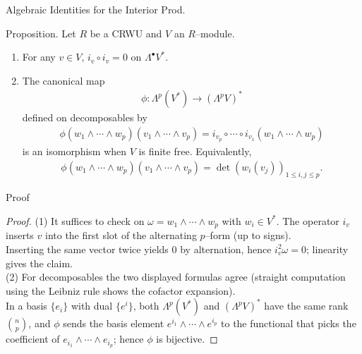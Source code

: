 

\begin{frame}{Algebraic Identities for the Interior Prod.}
\vspace{-0.3cm}
\begin{block}{Proposition.}
Let $R$ be a CRWU and $V$ an $R$–module.
\begin{enumerate}
\item For any $v\in V$, $i_v\circ i_v=0$ on $\Lambda^{\bullet}V^*$.
\item The canonical map
\begin{align*}
\phi:\Lambda^{p}(V^{*})\longrightarrow (\Lambda^{p}V)^{*}
\end{align*}
defined on decomposables by
\begin{align*}
\phi(w_1\wedge\cdots\wedge w_p)(v_1\wedge\cdots\wedge v_p)
= i_{v_p}\circ\cdots\circ i_{v_1}(w_1\wedge\cdots\wedge w_p)
\end{align*}
is an isomorphism when $V$ is finite free. Equivalently,
\begin{align*}
\phi(w_1\wedge\cdots\wedge w_p)(v_1\wedge\cdots\wedge v_p)
=\det\!\left(w_i(v_j)\right)_{1\le i,j\le p}.
\end{align*}
\end{enumerate}
\end{block}
\end{frame}

\begin{frame}{Proof}
    \begin{proof}
(1) It suffices to check on $\omega=w_1\wedge\cdots\wedge w_p$ with $w_i\in V^*$. The operator $i_v$ inserts $v$ into the first slot of the alternating $p$–form (up to signs).\\
Inserting the same vector twice yields $0$ by alternation, hence $i_v^2\omega=0$; linearity gives the claim.\\

(2) For decomposables the two displayed formulas agree (straight computation using the Leibniz rule shows the cofactor expansion).\\
In a basis $\{e_i\}$ with dual $\{e^i\}$, both $\Lambda^{p}(V^*)$ and $(\Lambda^{p}V)^*$ have the same rank $\binom{n}{p}$, and $\phi$ sends the basis element $e^{i_1}\wedge\cdots\wedge e^{i_p}$ to the functional that picks the coefficient of $e_{i_1}\wedge\cdots\wedge e_{i_p}$; hence $\phi$ is bijective.
\end{proof}
\end{frame}

